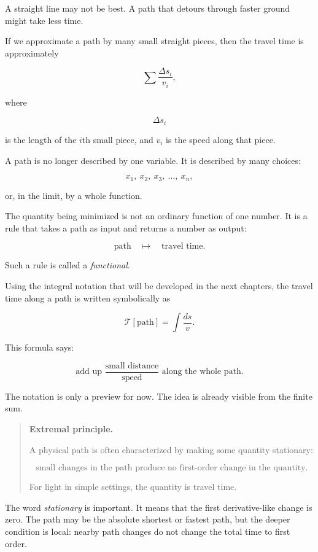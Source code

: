 A straight line may not be best.  A path that detours through faster ground might take
less time.

If we approximate a path by many small straight pieces, then the travel time is
approximately

\[
\sum \frac{\Delta s_i}{v_i},
\]

where

\[
\Delta s_i
\]

is the length of the \(i\)th small piece, and \(v_i\) is the speed along that piece.

A path is no longer described by one variable.  It is described by many choices:

\[
x_1,\ x_2,\ x_3,\ \ldots,\ x_n,
\]

or, in the limit, by a whole function.

The quantity being minimized is not an ordinary function of one number.  It is a rule
that takes a path as input and returns a number as output:

\[
\text{path}
\quad\longmapsto\quad
\text{travel time}.
\]

Such a rule is called a \emph{functional}.

Using the integral notation that will be developed in the next chapters, the travel time
along a path is written symbolically as

\[
\mathcal T[\text{path}]
=
\int \frac{ds}{v}.
\]

This formula says:

\[
\text{add up } \frac{\text{small distance}}{\text{speed}}
\text{ along the whole path}.
\]

The notation is only a preview for now.  The idea is already visible from the finite sum.

\begin{quote}
\textbf{Extremal principle.}

A physical path is often characterized by making some quantity stationary:

\[
\text{small changes in the path produce no first-order change in the quantity.}
\]

For light in simple settings, the quantity is travel time.
\end{quote}

The word \emph{stationary} is important.  It means that the first derivative-like change
is zero.  The path may be the absolute shortest or fastest path, but the deeper condition
is local: nearby path changes do not change the total time to first order.

